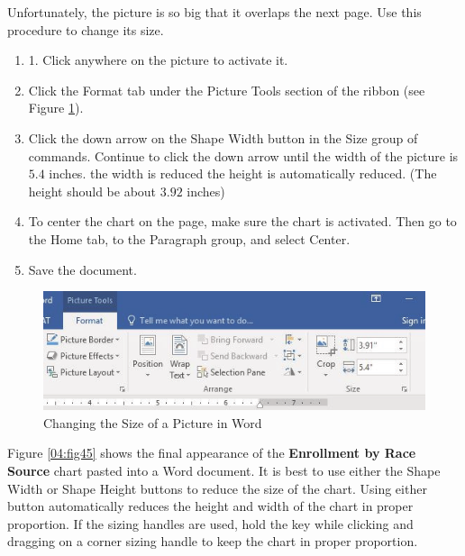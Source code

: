 Unfortunately, the picture is so big that it overlaps the next page. Use this procedure to change its size.

\begin{enumerate}
	\item 1. Click anywhere on the picture to activate it.
	\item Click the Format tab under the Picture Tools section of the ribbon (see Figure \ref{04:fig44}).
	\item Click the down arrow on the Shape Width button in the Size group of commands. Continue to click the down arrow until the width of the picture is $ 5.4 $ inches. the width is reduced the height is automatically reduced. (The height should be about $ 3.92 $ inches)
	\item To center the chart on the page, make sure the chart is activated. Then go to the Home tab, to the Paragraph group, and select Center.
	\item Save the document.
\end{enumerate}

\begin{figure}[H]
	\centering
	\includegraphics[width=\maxwidth{.95\linewidth}]{gfx/ch04_fig44}
	\caption{Changing the Size of a Picture in Word}
	\label{04:fig44}
\end{figure}

Figure \ref{04:fig45} shows the final appearance of the \textbf{Enrollment by Race Source} chart pasted into a Word document. It is best to use either the Shape Width or Shape Height buttons to reduce the size of the chart. Using either button automatically reduces the height and width of the chart in proper proportion. If the sizing handles are used, hold the  key while clicking and dragging on a corner sizing handle to keep the chart in proper proportion.

